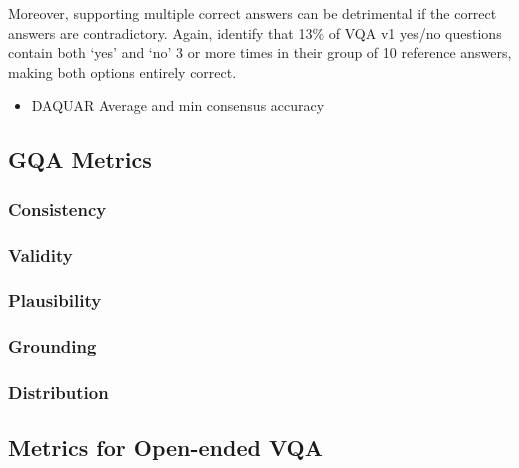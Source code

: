 Moreover, supporting multiple correct answers can be detrimental if the correct answers are contradictory. Again, \citeauthor{kafle2017visual} identify that 13\% of VQA v1 yes/no questions contain both `yes' and `no' 3 or more times in their group of 10 reference answers, making both options entirely correct.



\begin{itemize}
    \item DAQUAR Average and min consensus accuracy \cite{malinowski2015ask}
\end{itemize}

\subsection{GQA Metrics}
\subsubsection{Consistency}
\subsubsection{Validity}
\subsubsection{Plausibility}
\subsubsection{Grounding}
\subsubsection{Distribution}

\subsection{Metrics for Open-ended VQA}
\label{subsection:open_ended_vqa_metrics}

